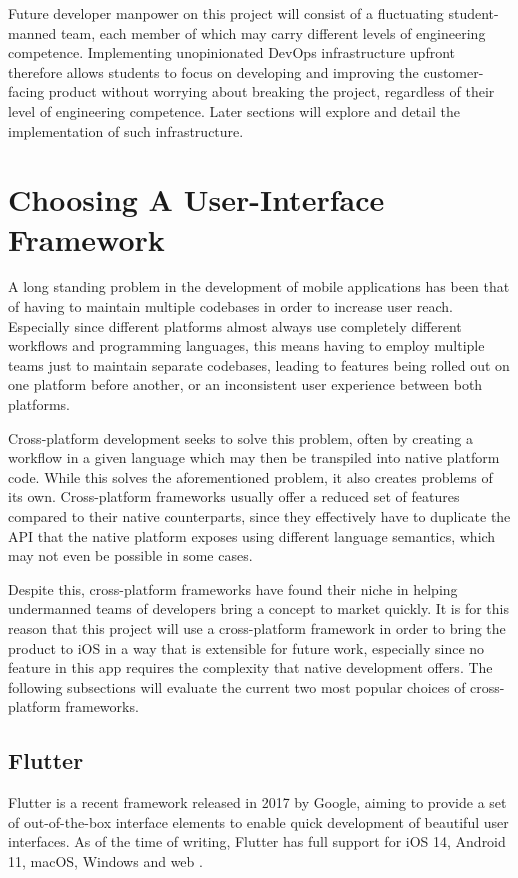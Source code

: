 Future developer manpower on this project will consist of a fluctuating student-manned team, each member of which may carry different levels of engineering competence. Implementing unopinionated DevOps infrastructure upfront therefore allows students to focus on developing and improving the customer-facing product without worrying about breaking the project, regardless of their level of engineering competence. Later sections will explore and detail the implementation of such infrastructure.

\section{Choosing A User-Interface Framework}
A long standing problem in the development of mobile applications has been that of having to maintain multiple codebases in order to increase user reach. Especially since different platforms almost always use completely different workflows and programming languages, this means having to employ multiple teams just to maintain separate codebases, leading to features being rolled out on one platform before another, or an inconsistent user experience between both platforms.

Cross-platform development seeks to solve this problem, often by creating a workflow in a given language which may then be transpiled into native platform code. While this solves the aforementioned problem, it also creates problems of its own. Cross-platform frameworks usually offer a reduced set of features compared to their native counterparts, since they effectively have to duplicate the API that the native platform exposes using different language semantics, which may not even be possible in some cases.

Despite this, cross-platform frameworks have found their niche in helping undermanned teams of developers bring a concept to market quickly. It is for this reason that this project will use a cross-platform framework in order to bring the product to iOS in a way that is extensible for future work, especially since no feature in this app requires the complexity that native development offers. The following subsections will evaluate the current two most popular choices of cross-platform frameworks.

\subsection{Flutter}
Flutter is a recent framework released in 2017 by Google, aiming to provide a set of out-of-the-box interface elements to enable quick development of beautiful user interfaces. As of the time of writing, Flutter has full support for iOS 14, Android 11, macOS, Windows and web \cite{fluttersupportedplatforms}.

